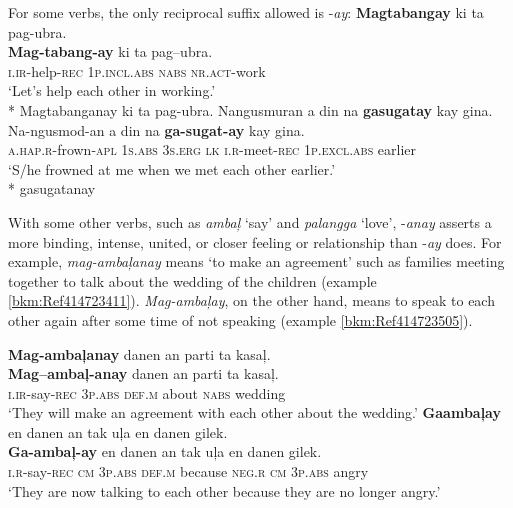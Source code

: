 For some verbs, the only reciprocal suffix allowed is -\textit{ay}:
\ea
\textbf{Magtabangay}  ki  ta  pag-ubra. \\\smallskip
\gll \textbf{Mag-tabang-ay}  ki  ta  pag--ubra. \\
\textsc{i.ir}-help-\textsc{rec}  1\textsc{p.incl.abs}  \textsc{nabs}  \textsc{nr.act}-work \\
\glt ‘Let’s help each other in working.’ \\\smallskip
* Magtabanganay ki ta pag-ubra.
\z
\ea
Nangusmuran  a  din  na  \textbf{gasugatay}  kay  gina. \\\smallskip
\gll Na-ngusmod-an  a  din  na  \textbf{ga-sugat-ay}  kay  gina. \\
\textsc{a.hap.r}-frown-\textsc{apl}  1\textsc{s.abs}  3\textsc{s.erg}  \textsc{lk}  \textsc{i.r}-meet-\textsc{rec}  1\textsc{p.excl.abs}  earlier \\
\glt ‘S/he frowned at me when we met each other earlier.’ \\\smallskip
* gasugatanay
\z

With some other verbs, such as \textit{ambaļ} ‘say’ and \textit{palangga} ‘love’, -\textit{anay} asserts a more binding, intense, united, or closer feeling or relationship than -\textit{ay} does. For example, \textit{mag-ambaļanay} means ‘to make an agreement’ such as families meeting together to talk about the wedding of the children (example \ref{bkm:Ref414723411}). \textit{Mag-ambaļay}, on the other hand, means to speak to each other again after some time of not speaking (example \ref{bkm:Ref414723505}).

\ea
\label{bkm:Ref414723411} \label{bkm:Ref414723505}
\textbf{Mag-ambaļanay}  danen  an  parti  ta  kasaļ. \\\smallskip
\gll \textbf{Mag--ambaļ-anay}  danen  an  parti  ta  kasaļ. \\
\textsc{i.ir}-say-\textsc{rec}  3\textsc{p.abs}  \textsc{def.m}  about  \textsc{nabs}  wedding \\
\glt ‘They will make an agreement with each other about the wedding.’
\z
\ea
\label{ex:nolongerangry}
\textbf{Gaambaļay}  en  danen  an  tak  uļa  en  danen  gilek. \\\smallskip
\gll \textbf{Ga-ambaļ-ay}  en  danen  an  tak  uļa  en  danen  gilek. \\
\textsc{i.r}-say-\textsc{rec}  \textsc{cm}  3\textsc{p.abs}  \textsc{def.m}  because  \textsc{neg.r}  \textsc{cm}  3\textsc{p.abs}  angry \\
\glt ‘They are now talking to each other because they are no longer angry.’
\z

